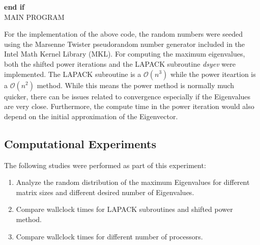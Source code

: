 \documentclass[11pt, oneside]{article}
\begin{document}
\begin{algorithm}
\textbf{end if} \\
\caption{MAIN PROGRAM}
\label{algomain}
\end{algorithm}

For the implementation of the above code, the random numbers were seeded using the Marsenne Twister pseudorandom number generator included in the Intel Math Kernel Library (MKL). For computing the maximum eigenvalues, both the shifted power iterations and the LAPACK subroutine \emph{dsyev} were implemented. The LAPACK subroutine is a $\mathcal{O}(n^3)$ while the power iteartion is a $\mathcal{O}(n^2)$ method. While this means the power method is normally much quicker, there can be issues related to convergence especially if the Eigenvalues are very close. Furthermore, the compute time in the power iteration would also depend on the initial approximation of the Eigenvector.

\subsection{Computational Experiments}
The following studies were performed as part of this experiment:
\begin{enumerate}
\item Analyze the random distribution of the maximum Eigenvalues for different matrix sizes and different desired number of Eigenvalues.
\item Compare wallclock times for LAPACK subroutines and shifted power method.
\item Compare wallclock times for different number of processors.
\end{enumerate}
\end{document}
